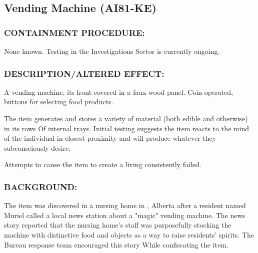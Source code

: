 \subsection*{Vending Machine (AI81-KE)}
\subsubsection*{CONTAINMENT PROCEDURE:}
\par None known. Testing in the
Investigations Sector is currently
ongoing.
\subsubsection*{DESCRIPTION/ALTERED EFFECT:}
\par A vending machine, its front covered in a
faux-wood panel. Coin-operated, buttons
for selecting food products.
\par The item generates and stores a variety of material (both edible
and otherwise) in its rows Of internal trays. Initial testing suggests
the item reacts to the mind of the individual in closest proximity
and will produce whatever they subconsciously desire.
\par Attempts to cause the item to create a living 
consistently failed.
\subsubsection*{BACKGROUND:}
\par The item was discovered in a nursing home in ,
Alberta after a resident named Muriel  called a local
news station about a "magic" vending machine. The news story
reported that the nursing home's staff was purposefully stocking
the machine with distinctive food and objects as a way to raise
residents' spirits. The Bureau response team encouraged this
story While confiscating the item.